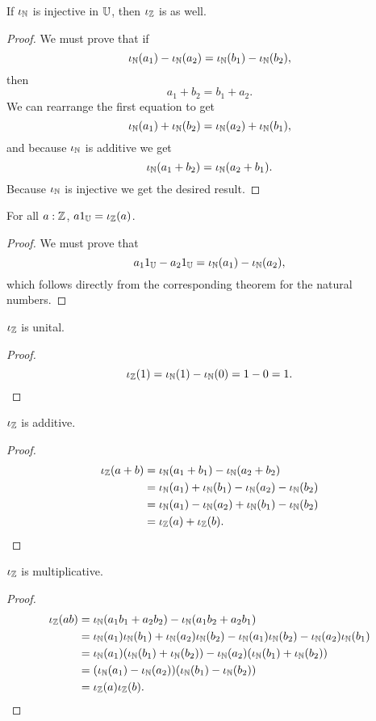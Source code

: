 \documentclass[../../math.tex]{subfiles}
\begin{document}
\begin{instance}
    If $\iN$ is injective in $\U$, then $\iZ$ is as well.
\end{instance}
\begin{proof}
    We must prove that if
    \[
        \iN(a_1) - \iN(a_2) = \iN(b_1) - \iN(b_2),
    \]
    then
    \[
        a_1 + b_2 = b_1 + a_2.
    \]
    We can rearrange the first equation to get
    \[
        \iN(a_1) + \iN(b_2) = \iN(a_2) + \iN(b_1),
    \]
    and because $\iN$ is additive we get
    \[
        \iN(a_1 + b_2) = \iN(a_2 + b_1).
    \]
    Because $\iN$ is injective we get the desired result.
\end{proof}

\begin{theorem}
    For all $a : \Z$, $a1_\U = \iZ(a)$.
\end{theorem}
\begin{proof}
    We must prove that
    \[
        a_1 1_\U - a_2 1_\U = \iN(a_1) - \iN(a_2),
    \]
    which follows directly from the corresponding theorem for the natural
    numbers.
\end{proof}

\begin{instance} \label{from_int_one}
    $\iZ$ is unital.
\end{instance}
\begin{proof}
    \[
        \iZ(1) = \iN(1) - \iN(0) = 1 - 0 = 1.
    \]
\end{proof}

\begin{instance} \label{from_int_plus}
    $\iZ$ is additive.
\end{instance}
\begin{proof}
    \begin{align*}
        \iZ(a + b) &= \iN(a_1 + b_1) - \iN(a_2 + b_2) \\ &=
        \iN(a_1) + \iN(b_1) - \iN(a_2) - \iN(b_2) \\ &=
        \iN(a_1) - \iN(a_2) + \iN(b_1) - \iN(b_2) \\ &=
        \iZ(a) + \iZ(b).
    \end{align*}
\end{proof}

\begin{instance} \label{from_int_mult}
    $\iZ$ is multiplicative.
\end{instance}
\begin{proof}
    \begin{align*}
        \iZ(ab)
        &= \iN(a_1b_1 + a_2b_2) - \iN(a_1b_2 + a_2b_1) \\
        &= \iN(a_1)\iN(b_1) + \iN(a_2)\iN(b_2)
            - \iN(a_1)\iN(b_2) - \iN(a_2)\iN(b_1) \\
        &= \iN(a_1)(\iN(b_1) + \iN(b_2)) - \iN(a_2)(\iN(b_1) + \iN(b_2)) \\
        &= (\iN(a_1) - \iN(a_2)) (\iN(b_1) - \iN(b_2)) \\
        &= \iZ(a) \iZ(b).
    \end{align*}
\end{proof}
\end{document}
